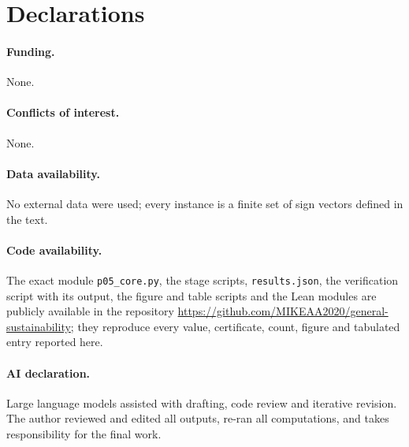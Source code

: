 \section*{Declarations}
\paragraph{Funding.} None.
\paragraph{Conflicts of interest.} None.
\paragraph{Data availability.} No external data were used; every instance is a finite set of sign vectors defined in the text.
\paragraph{Code availability.} The exact module \texttt{p05\_core.py}, the stage scripts, \texttt{results.json}, the verification script with its output, the figure and table scripts and the Lean modules are publicly available in the repository \url{https://github.com/MIKEAA2020/general-sustainability}; they reproduce every value, certificate, count, figure and tabulated entry reported here.
\paragraph{AI declaration.} Large language models assisted with drafting, code review and iterative revision. The author reviewed and edited all outputs, re-ran all computations, and takes responsibility for the final work.

